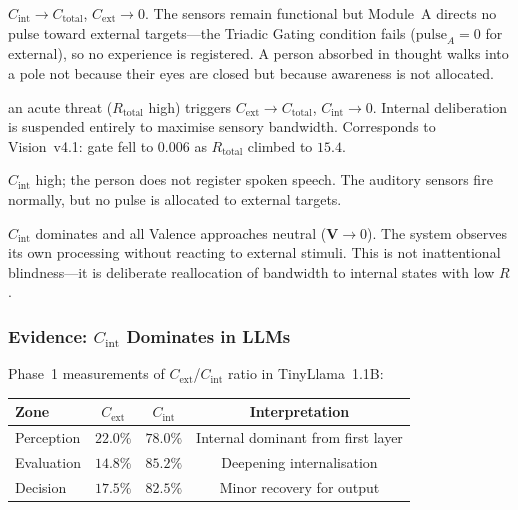\documentclass[12pt,a4paper]{article}
\newcommand{\Rtot}{R_{\mathrm{total}}}
\newcommand{\Cext}{C_{\mathrm{ext}}}
\newcommand{\Cint}{C_{\mathrm{int}}}
\newcommand{\pp}[1]{\textbf{#1}}
\begin{document}
\begin{description}[leftmargin=1.4em]
  \item[\pp{Inattentional blindness:}] $\Cint\to C_{\mathrm{total}}$,
    $\Cext\to 0$. The sensors remain functional but Module~A directs no pulse
    toward external targets---the Triadic Gating condition fails
    ($\mathrm{pulse}_A = 0$ for external), so no experience is registered.
    A person absorbed in thought walks into a pole not because their eyes are
    closed but because awareness is not allocated.
  \item[\pp{Survival reflex:}] an acute threat ($\Rtot$ high) triggers
    $\Cext\to C_{\mathrm{total}}$, $\Cint\to 0$. Internal deliberation is
    suspended entirely to maximise sensory bandwidth. Corresponds to Vision~v4.1:
    gate fell to $0.006$ as $\Rtot$ climbed to $15.4$.
  \item[\pp{Deep thinking:}] $\Cint$ high; the person does not register spoken
    speech. The auditory sensors fire normally, but no pulse is allocated to
    external targets.
  \item[\pp{Meditative equanimity:}] $\Cint$ dominates and all Valence
    approaches neutral ($\mathbf{V}\to 0$). The system observes its own
    processing without reacting to external stimuli. This is not inattentional
    blindness---it is deliberate reallocation of bandwidth to internal states
    with low $R$.
\end{description}

\subsubsection{Evidence: $\Cint$ Dominates in LLMs}

Phase~1 measurements of $\Cext$/$\Cint$ ratio in TinyLlama~1.1B:

\begin{center}
\begin{tabular}{@{}lccc@{}}
\toprule
\textbf{Zone} & $\Cext$ & $\Cint$ & \textbf{Interpretation}\\
\midrule
Perception  & $22.0\%$ & $78.0\%$ & Internal dominant from first layer \\
Evaluation  & $14.8\%$ & $85.2\%$ & Deepening internalisation \\
Decision    & $17.5\%$ & $82.5\%$ & Minor recovery for output \\
\bottomrule
\end{tabular}
\end{center}
\end{document}
